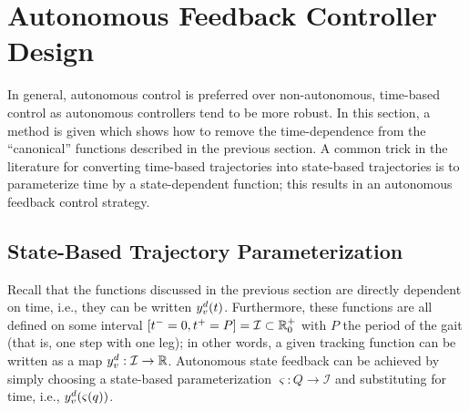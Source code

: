 \section{Autonomous Feedback Controller Design} \noindent
In general, autonomous control is preferred over non-autonomous, time-based
control as autonomous controllers tend to be more robust. In this section, a
method is given which shows how to remove the time-dependence from the
``canonical'' functions described in the previous section. A common trick in the
literature \cite{Westervelt2007} for converting time-based trajectories into
state-based trajectories is to parameterize time by a state-dependent function;
this results in an autonomous feedback control strategy.

\subsection{State-Based Trajectory Parameterization} \noindent
Recall that the functions discussed in the previous section are directly dependent on time, i.e., they can be written $y_{v}^{d}(t)$. Furthermore, these functions are all defined on some interval $[t^- = 0, t^+ = P] = \mathcal{I} \subset \mathbb{R}_{0}^{+}$ with $P$ the period of the gait (that is, one step with one leg); in other words, a given tracking function can be written as a map $y_{v}^{d} : \mathcal{I} \to \mathbb{R}$. Autonomous state feedback can be achieved by simply choosing a state-based parameterization $\varsigma : Q \to \mathcal{I}$ and substituting for time, i.e., $y_{v}^{d}(\varsigma(q))$.

